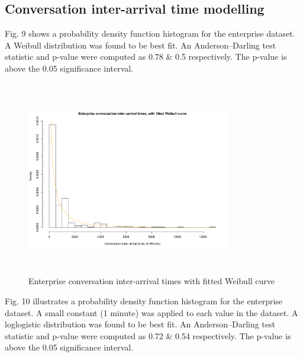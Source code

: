 \documentclass[conference]{IEEEtran}
\begin{document}
\subsection{Conversation inter-arrival time modelling}


Fig. 9 shows a probability density function histogram for the enterprise dataset. A  Weibull distribution was found to be best fit. An Anderson--Darling test statistic and p-value were computed as 0.78 \& 0.5 respectively. The p-value is above the 0.05 significance interval. 

\begin{figure}
\begin{center}
\includegraphics[height=8.5cm, width=9cm]{09_interarrival_enterprise.pdf} 
\caption{Enterprise conversation inter-arrival times with fitted Weibull curve}
\end{center}
\label{fig:interarrival_ent}
\end{figure}


Fig. 10 illustrates a probability density function histogram for the enterprise dataset. A small constant (1 minute) was applied to each value in the dataset. A loglogistic distribution was found to be best fit. An Anderson--Darling test statistic and p-value were computed as 0.72 \& 0.54 respectively. The p-value is above the 0.05 significance interval. 
\end{document}
